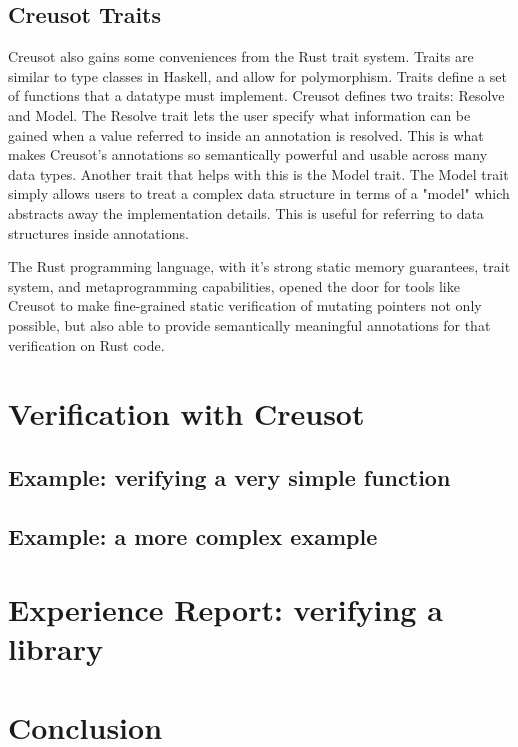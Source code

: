 \documentclass[12pt]{article}
\begin{document}
\subsection{Creusot Traits}
Creusot also gains some conveniences from the Rust trait system. 
Traits are similar to type classes in Haskell, and allow for polymorphism. 
Traits define a set of functions that a datatype must implement. 
Creusot defines two traits: Resolve and Model. 
The Resolve trait lets the user specify what information can be gained when a value referred to inside an annotation is resolved. 
This is what makes Creusot's annotations so semantically powerful and usable across many data types. 
Another trait that helps with this is the Model trait. The Model trait simply allows users to treat a complex data structure in terms of a "model" which abstracts away the implementation details. 
This is useful for referring to data structures inside annotations.  

The Rust programming language, with it's strong static memory guarantees, trait system, and metaprogramming capabilities, 
opened the door for tools like Creusot to make fine-grained static verification of mutating pointers not only possible, but also able to provide 
semantically meaningful annotations for that verification on Rust code.   

\section{Verification with Creusot}

\subsection{Example: verifying a very simple function}

\subsection{Example: a more complex example}

\section{Experience Report: verifying a library} %

\section{Conclusion}
\end{document}
